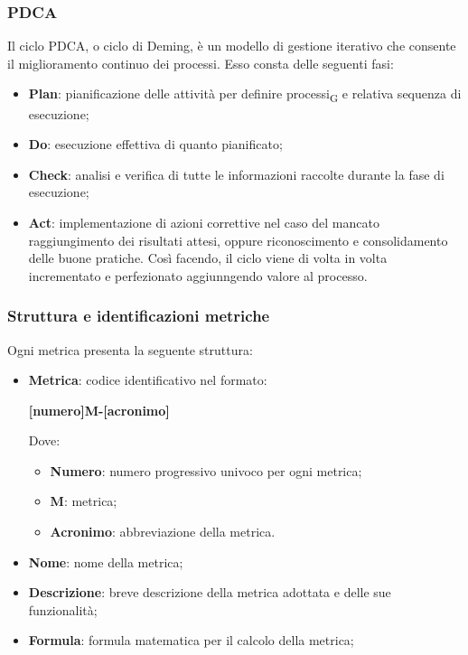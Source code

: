 {{\subsubsection{PDCA}
Il ciclo PDCA, o ciclo di Deming, è un modello di gestione iterativo che consente il miglioramento continuo dei processi. Esso consta delle seguenti fasi:
\begin{itemize}
    \item \textbf{Plan}: pianificazione delle attività per definire {processi\textsubscript{G}} e relativa sequenza di esecuzione;
    \item \textbf{Do}: esecuzione effettiva di quanto pianificato;
    \item \textbf{Check}: analisi e verifica di tutte le informazioni raccolte durante la fase di esecuzione;
    \item \textbf{Act}: implementazione di azioni correttive nel caso del mancato raggiungimento dei risultati attesi, oppure riconoscimento e 
    consolidamento delle buone pratiche. Così facendo, il ciclo viene di volta in volta incrementato e perfezionato aggiunngendo valore al processo.
\end{itemize}

\subsubsection{Struttura e identificazioni metriche}
Ogni metrica presenta la seguente struttura:
\begin{itemize}
    \item \textbf{Metrica}:
    codice identificativo nel formato:
    \begin{center}
        \textbf{[numero]M-[acronimo]}
    \end{center}
    Dove:
    \begin{itemize}
        \item \textbf{Numero}: numero progressivo univoco per ogni metrica;
        \item \textbf{M}: metrica;
        \item \textbf{Acronimo}: abbreviazione della metrica.
    \end{itemize}
    \item \textbf{Nome}: nome della metrica;
    \item \textbf{Descrizione}: breve descrizione della metrica adottata e delle sue funzionalità;
    \item \textbf{Formula}: formula matematica per il calcolo della metrica;
\end{itemize}

}}
